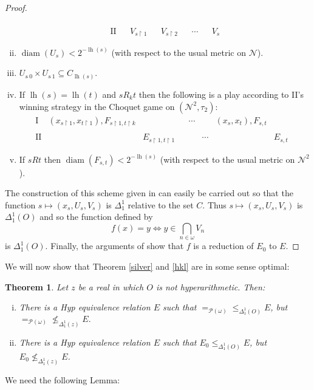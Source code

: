 \documentclass[11pt, english]{article}
\newtheorem{thm}{Theorem}
\DeclareMathOperator{\lh}{lh} \DeclareMathOperator{\inn}{Inn}
\DeclareMathOperator{\diam}{diam}
\newcommand{\restrict}{\upharpoonright}
\newcommand{\baire}{\mathscr N}
\begin{document}
\begin{proof}
\begin{enumerate}[(i)]
$$\begin{array}{rlllllllll}
   &                                   &                  &                                     &                  &         &        &         &  \\
\mathrm{II} &                                   & V_{s\restrict 1}
& & V_{s\restrict 2} &         & \cdots &         & V_s
\end{array}
$$
\item $\diam(U_s)<2^{-\lh(s)}$ (with respect to the usual metric
on $\baire$). \item $U_{s\hat{\ }0}\times U_{s\hat{\ }1}\subseteq
C_{\lh(s)}$. \item If $\lh(s)=\lh(t)$ and $s R_k t$ then the
following is a play according to II's winning strategy in the
Choquet game on $(\baire^2,\tau_2)$:
$$
\begin{array}{rlllllllll}
\mathrm{I}  & (x_{s\restrict 1},x_{t\restrict 1}), F_{s\restrict 1,t\restrict k} &                   &                  & \cdots  &        & (x_s,x_t),F_{s,t}\\
   &                                   &                  &                                     &                  &         &        &         &  \\
\mathrm{II} &                                   & E_{s\restrict
1,t\restrict 1} &  &         & \cdots &         & E_{s,t}
\end{array}
$$
\item If $sRt$ then $\diam(F_{s,t})<2^{-\lh(s)}$ (with respect to
the usual metric on $\baire^2$).
\end{enumerate}
The construction of this scheme given in \cite{gao09} can easily
be carried out so that the function $s\mapsto (x_s, U_s, V_s)$ is
$\Delta^1_1$ relative to the set $C$. Thus $s\mapsto (x_s, U_s,
V_s)$ is $\Delta^1_1(O)$ and so the function defined by
$$
f(x)=y\iff y\in\bigcap_{n\in\omega} V_n
$$
is $\Delta^1_1(O)$. Finally, the arguments of \cite[p.
146--147]{gao09} show that $f$ is a reduction of $E_0$ to $E$.
\end{proof}

We will now show that Theorem \ref{silver} and \ref{hkl} are in
some sense optimal:

\begin{thm}
Let $z$ be a real in which $O$ is not hyperarithmetic. Then:
\begin{enumerate}[(i)]
\item There is a Hyp equivalence relation $E$ such that
$=_{\mathcal{P}(\omega)}\leq_{\Delta^1_1(O)} E$, but
$=_{\mathcal{P}(\omega)}\nleq_{\Delta^1_1(z)} E.$

\item There is a Hyp equivalence relation $E$ such that
$E_0\leq_{\Delta^1_1(O)} E$, but $E_0\nleq_{\Delta^1_1(z)} E$.
\end{enumerate}
\label{optimal}
\end{thm}
We need the following Lemma:
\end{document}
